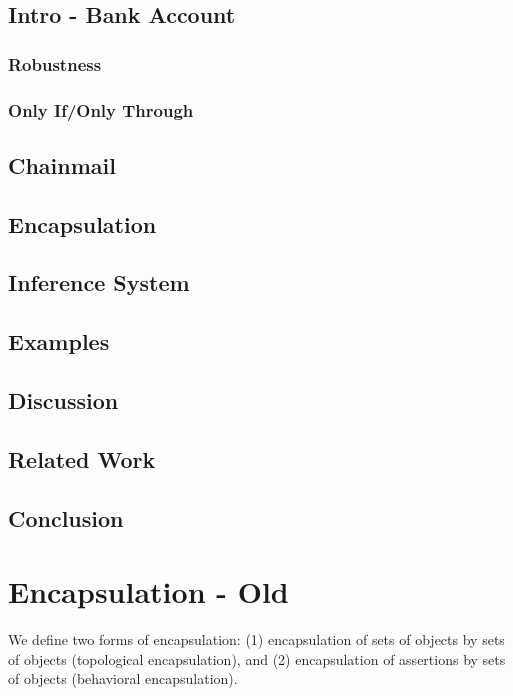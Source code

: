 \documentclass[acmsmall,review,anonymous]{acmart}\settopmatter{printfolios=true,printccs=false,printacmref=false}
\begin{document}
\subsection{Intro - Bank Account}

\subsubsection{Robustness}

\subsubsection{Only If/Only Through}

\subsection{Chainmail}

\subsection{Encapsulation}

\subsection{Inference System}

\subsection{Examples}

\subsection{Discussion}

\subsection{Related Work}

\subsection{Conclusion}




\section{Encapsulation - Old}
We define two forms of encapsulation: (1) encapsulation of sets of objects by sets of objects (topological encapsulation), and (2) encapsulation of assertions by sets of objects (behavioral encapsulation).
\end{document}
